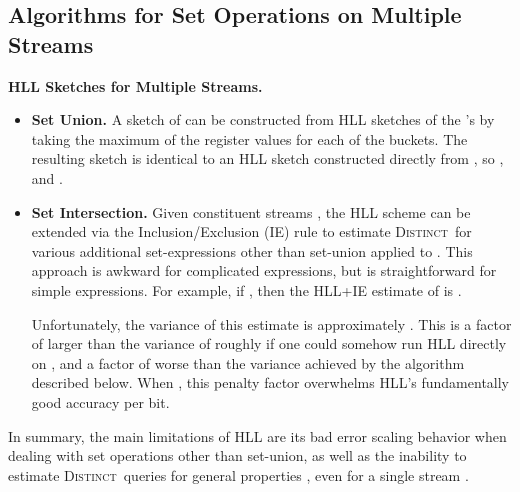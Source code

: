 \documentclass{article}
\newcommand{\distinctP}{\textsc{Distinct}}
\newcommand{\distinct}{\textsc{Distinct}}
\begin{document}
\subsection{Algorithms for Set Operations on Multiple Streams}
\noindent \textbf{HLL Sketches for Multiple Streams.}\label{subsubHLL2}
 \begin{itemize}
 \item \textbf{Set Union.} A sketch of  can be constructed from  HLL sketches of the 's by taking
the maximum of the  register values for each of the  buckets. 
The resulting sketch is identical to an HLL sketch constructed directly from , so
, and
.

\item \textbf{Set Intersection.} Given constituent streams , the HLL scheme can be extended via the Inclusion/Exclusion (IE) rule to estimate \distinct\ 
for various additional set-expressions other than set-union applied to . 
This approach is awkward for
complicated expressions, but is straightforward for simple expressions. For example, if , then
the HLL+IE estimate of  is .

Unfortunately, the variance of this estimate is approximately
. This is a factor of  larger than the variance
of roughly  if one could somehow run HLL directly on , and a factor of  worse than the variance achieved by
the  algorithm described below. When , this penalty
factor overwhelms HLL's fundamentally good accuracy per bit.
\end{itemize}
In summary, the main limitations of HLL are its bad error scaling behavior when dealing with set operations other than set-union, 
as well as the inability to estimate \distinctP\ queries for general properties , even for a single stream . \\
\end{document}
